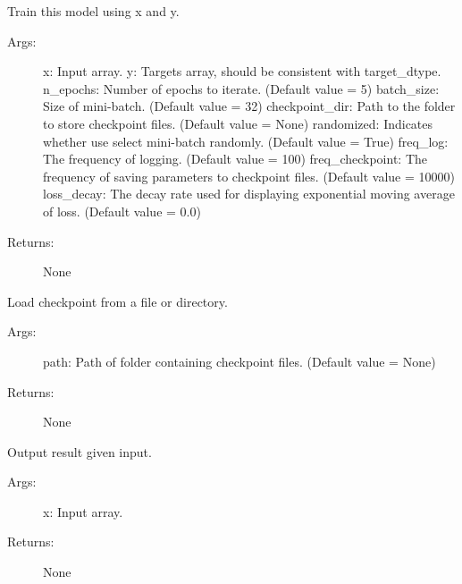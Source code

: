 \documentclass[letterpaper,10pt,english]{sphinxmanual}
\begin{document}
\begin{fulllineitems}
\begin{fulllineitems}
\label{legonet:legonet.models.NeuralNetwork.fit}
Train this model using x and y.
\begin{description}
\item[{Args:}] \leavevmode
x: Input array.
y: Targets array, should be consistent with target\_dtype.
n\_epochs: Number of epochs to iterate. (Default value = 5)
batch\_size: Size of mini-batch. (Default value = 32)
checkpoint\_dir: Path to the folder to store checkpoint files. (Default value = None)
randomized: Indicates whether use select mini-batch randomly. (Default value = True)
freq\_log: The frequency of logging. (Default value = 100)
freq\_checkpoint: The frequency of saving parameters to checkpoint files. (Default value = 10000)
loss\_decay: The decay rate used for displaying exponential moving average of loss. (Default value = 0.0)

\item[{Returns:}] \leavevmode
None

\end{description}

\end{fulllineitems}


\begin{fulllineitems}
\label{legonet:legonet.models.NeuralNetwork.load_checkpoint}
Load checkpoint from a file or directory.
\begin{description}
\item[{Args:}] \leavevmode
path: Path of folder containing checkpoint files. (Default value = None)

\item[{Returns:}] \leavevmode
None

\end{description}

\end{fulllineitems}


\begin{fulllineitems}
\label{legonet:legonet.models.NeuralNetwork.predict}
Output result given input.
\begin{description}
\item[{Args:}] \leavevmode
x: Input array.

\item[{Returns:}] \leavevmode
None

\end{description}

\end{fulllineitems}


\end{fulllineitems}
\end{document}
